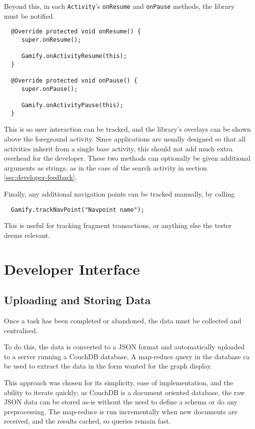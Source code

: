 Beyond this, in each \verb|Activity|'s \verb|onResume| and \verb|onPause|
methods, the library must be notified.

\begin{verbatim}
  @Override protected void onResume() {
     super.onResume();

     Gamify.onActivityResume(this);
  }

  @Override protected void onPause() {
     super.onPause();

     Gamify.onActivityPause(this);
  }
\end{verbatim}

This is so user interaction can be tracked, and the library's overlays can be
shown above the foreground activity. Since applications are usually designed so
that all activities inherit from a single base activity, this should not add
much extra overhead for the developer. These two methods can optionally be given 
additional arguments as strings, as in the case of the search activity in section
\ref{sec:developer-feedback}.

Finally, any additional navigation points can be tracked manually, by calling

\begin{verbatim}
  Gamify.trackNavPoint("Navpoint name");
\end{verbatim}

This is useful for tracking fragment transactions, or anything else the tester
deems relevant.

\section{Developer Interface}

\subsection{Uploading and Storing Data}

Once a task has been completed or abandoned, the data must be collected and centralised.

To do this, the data is converted to a JSON format and automatically uploaded to a server
running a CouchDB database. A map-reduce query in the database ca be used to extract the data
in the form wanted for the graph display.

This approach was chosen for its simplicity, ease of implementation, and the ability to iterate quickly;
as CouchDB is a document oriented database, the raw JSON data can be stored as-is without the need
to define a schema or do any preprocessing. The map-reduce is run incrementally when new documents are 
received, and the results cached, so queries remain fast.

